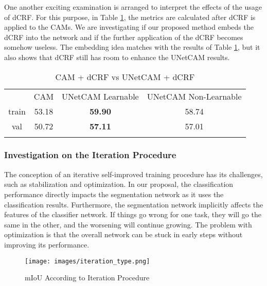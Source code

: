 \documentclass[sn-mathphys]{sn-jnl}
\theoremstyle{thmstyleone}
\theoremstyle{thmstyletwo}\newtheorem{example}{Example}\newtheorem{remark}{Remark}
\theoremstyle{thmstylethree}\newtheorem{definition}{Definition}
\begin{document}
One another exciting examination is arranged to interpret the effects of the usage of dCRF. For this purpose, in Table \ref{crf_cam_vs_unetcam}, the metrics are calculated after dCRF is applied to the CAMs. We are investigating if our proposed method embeds the dCRF into the network and if the further application of the dCRF becomes somehow useless. The embedding idea matches with the results of Table \ref{crf_cam_vs_unetcam}, but it also shows that dCRF still has room to enhance the UNetCAM results.

\begin{table}[!ht]
    \begin{center}
        \begin{minipage}{\textwidth}
            \caption{CAM + dCRF vs UNetCAM + dCRF}\label{crf_cam_vs_unetcam}\begin{tabular*}{\textwidth}{@{\extracolsep{\fill}}cccc@{\extracolsep{\fill}}}
            \toprule & CAM & UNetCAM Learnable & UNetCAM Non-Learnable \\
            train & 53.18 & \textbf{59.90} & 58.74 \\
            val & 50.72 & \textbf{57.11} & 57.01  \\
            \botrule
            \end{tabular*}
        \end{minipage}
    \end{center}
\end{table}

\subsubsection{Investigation on the Iteration Procedure}

The conception of an iterative self-improved training procedure has its challenges, such as stabilization and optimization. In our proposal, the classification performance directly impacts the segmentation network as it uses the classification results. Furthermore, the segmentation network implicitly affects the features of the classifier network. If things go wrong for one task, they will go the same in the other, and the worsening will continue growing. The problem with optimization is that the overall network can be stuck in early steps without improving its performance. 

\begin{figure}[!ht]
    \centering
    \texttt{[image: images/iteration\_type.png]}
    \caption{mIoU According to Iteration Procedure}
    \label{label_generation}
\end{figure}
\end{document}
